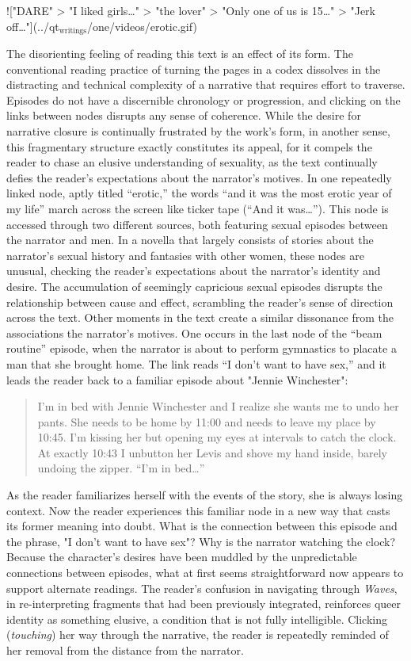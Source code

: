 \documentclass[11pt]{article}
\begin{document}
!["DARE" > "I liked girls\ldots{}" > "the lover" > "Only one of us is
15\ldots{}" > "Jerk off…"](../qt\(_{\text{writings}}\)/one/videos/erotic.gif)

The disorienting feeling of reading this text is an effect of its
form.  The conventional reading practice of turning the pages in a
codex dissolves in the distracting and technical complexity of a
narrative that requires effort to traverse. Episodes do not have a
discernible chronology or progression, and clicking on the links
between nodes disrupts any sense of coherence. While the desire for
narrative closure is continually frustrated by the work's form, in
another sense, this fragmentary structure exactly constitutes its
appeal, for it compels the reader to chase an elusive understanding of
sexuality, as the text continually defies the reader’s expectations
about the narrator's motives. In one repeatedly linked node, aptly
titled “erotic,” the words “and it was the most erotic year of my
life” march across the screen like ticker tape (“And it was\ldots{}”). This
node is accessed through two different sources, both featuring sexual
episodes between the narrator and men. In a novella that largely
consists of stories about the narrator’s sexual history and fantasies
with other women, these nodes are unusual, checking the reader’s
expectations about the narrator’s identity and desire. The
accumulation of seemingly capricious sexual episodes disrupts the
relationship between cause and effect, scrambling the reader's sense
of direction across the text. Other moments in the text create a
similar dissonance from the associations the narrator's motives. One
occurs in the last node of the “beam routine” episode, when the
narrator is about to perform gymnastics to placate a man that she
brought home. The link reads “I don’t want to have sex,” and it leads
the reader back to a familiar episode about "Jennie Winchester":

\begin{quote}
I’m in bed with Jennie Winchester and I realize she wants me to undo
her pants. She needs to be home by 11:00 and needs to leave my place
by 10:45. I’m kissing her but opening my eyes at intervals to catch
the clock. At exactly 10:43 I unbutton her Levis and shove my hand
inside, barely undoing the zipper. “I’m in bed\ldots{}”
\end{quote}

As the reader familiarizes herself with the events of the story, she
is always losing context. Now the reader experiences this familiar
node in a new way that casts its former meaning into doubt. What is
the connection between this episode and the phrase, "I don't want to
have sex"? Why is the narrator watching the clock? Because the
character's desires have been muddled by the unpredictable connections
between episodes, what at first seems straightforward now appears to
support alternate readings. The reader’s confusion in navigating
through \emph{Waves}, in re-interpreting fragments that had been previously
integrated, reinforces queer identity as something elusive, a
condition that is not fully intelligible. Clicking (\emph{touching}) her
way through the narrative, the reader is repeatedly reminded of her
removal from the distance from the narrator.
\end{document}
